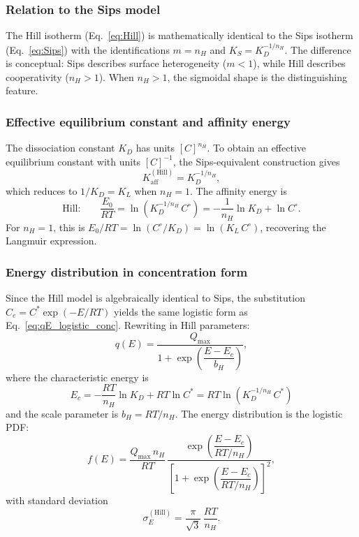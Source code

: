 \documentclass[12pt]{article}
\begin{document}
	\subsubsection{Relation to the Sips model}

	The Hill isotherm (Eq.~\eqref{eq:Hill}) is mathematically
	identical to the Sips isotherm (Eq.~\eqref{eq:Sips}) with the
	identifications $m = n_H$ and $K_S = K_D^{-1/n_H}$.  The
	difference is conceptual: Sips describes surface heterogeneity
	($m < 1$), while Hill describes cooperativity ($n_H > 1$).
	When $n_H > 1$, the sigmoidal shape is the distinguishing
	feature.

	\subsubsection{Effective equilibrium constant and affinity energy}

	The dissociation constant $K_D$ has units $[C]^{n_H}$. To
	obtain an effective equilibrium constant with units $[C]^{-1}$,
	the Sips-equivalent construction gives
	\begin{equation}
		K_{\mathrm{aff}}^{\mathrm{(Hill)}}
		= K_D^{-1/n_H},
	\end{equation}
	which reduces to $1/K_D = K_L$ when $n_H = 1$.  The affinity
	energy is
	\begin{equation}
		\text{Hill:}\qquad
		\frac{E_0}{RT}
		= \ln(K_D^{-1/n_H}\,C^\circ)
		= -\frac{1}{n_H}\ln K_D + \ln C^\circ.
		\label{eq:E_Hill}
	\end{equation}
	For $n_H = 1$, this is $E_0/RT = \ln(C^\circ/K_D) = \ln(K_L\,C^\circ)$,
	recovering the Langmuir expression.

	\subsubsection{Energy distribution in concentration form}

	Since the Hill model is algebraically identical to Sips, the
	substitution $C_e = C^{\ast}\exp(-E/RT)$ yields the same
	logistic form as Eq.~\eqref{eq:qE_logistic_conc}.  Rewriting
	in Hill parameters:
	\begin{equation}
		q(E) = \frac{Q_{\max}}
		{1 + \exp\!\left(\dfrac{E - E_c}{b_H}\right)},
		\label{eq:qE_Hill}
	\end{equation}
	where the characteristic energy is
	\begin{equation}
		E_c = -\frac{RT}{n_H}\ln K_D
		+ RT\ln C^{\ast}
		= RT\ln(K_D^{-1/n_H}\,C^{\ast})
	\end{equation}
	and the scale parameter is $b_H = RT / n_H$.  The energy
	distribution is the logistic PDF:
	\begin{equation}
		f(E) = \frac{Q_{\max}\, n_H}{RT}\,
		\frac{\exp\!\left(\dfrac{E - E_c}{RT/n_H}\right)}
		{\left[1 + \exp\!\left(\dfrac{E - E_c}{RT/n_H}\right)
		\right]^{2}},
		\label{eq:fE_Hill}
	\end{equation}
	with standard deviation
	\begin{equation}
		\sigma_E^{\mathrm{(Hill)}}
		= \frac{\pi}{\sqrt{3}}\,\frac{RT}{n_H}.
		\label{eq:sigmaE_Hill}
	\end{equation}
\end{document}

